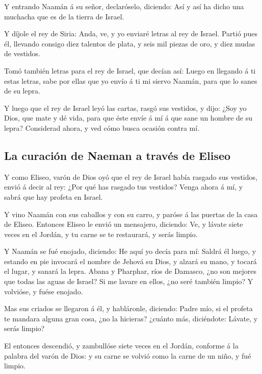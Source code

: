  Y entrando Naamán á su señor, declaróselo, diciendo: Así y
así ha dicho una muchacha que es de la tierra de Israel.

 Y díjole el rey de Siria: Anda, ve, y yo enviaré letras al
rey de Israel. Partió pues él, llevando consigo diez talentos de plata,
y seis mil piezas de oro, y diez mudas de vestidos.

 Tomó también letras para el rey de Israel, que decían así:
Luego en llegando á ti estas letras, sabe por ellas que yo envío á ti mi
siervo Naamán, para que lo sanes de su lepra.

 Y luego que el rey de Israel leyó las cartas, rasgó sus
vestidos, y dijo: ¿Soy yo Dios, que mate y dé vida, para que éste envíe
á mí á que sane un hombre de su lepra? Considerad ahora, y ved cómo
busca ocasión contra mí.

\hypertarget{la-curaciuxf3n-de-naeman-a-travuxe9s-de-eliseo}{%
\subsection{La curación de Naeman a través de
Eliseo}\label{la-curaciuxf3n-de-naeman-a-travuxe9s-de-eliseo}}

 Y como Eliseo, varón de Dios oyó que el rey de Israel había
rasgado sus vestidos, envió á decir al rey: ¿Por qué has rasgado tus
vestidos? Venga ahora á mí, y sabrá que hay profeta en Israel.

 Y vino Naamán con sus caballos y con su carro, y paróse á
las puertas de la casa de Eliseo.  Entonces Eliseo le envió
un mensajero, diciendo: Ve, y lávate siete veces en el Jordán, y tu
carne se te restaurará, y serás limpio.

 Y Naamán se fué enojado, diciendo: He aquí yo decía para
mí: Saldrá él luego, y estando en pie invocará el nombre de Jehová su
Dios, y alzará su mano, y tocará el lugar, y sanará la lepra.
 Abana y Pharphar, ríos de Damasco, ¿no son mejores que
todas las aguas de Israel? Si me lavare en ellos, ¿no seré también
limpio? Y volvióse, y fuése enojado.

 Mas sus criados se llegaron á él, y habláronle, diciendo:
Padre mío, si el profeta te mandara alguna gran cosa, ¿no la hicieras?
¿cuánto más, diciéndote: Lávate, y serás limpio?

 El entonces descendió, y zambullóse siete veces en el
Jordán, conforme á la palabra del varón de Dios: y su carne se volvió
como la carne de un niño, y fué limpio.

